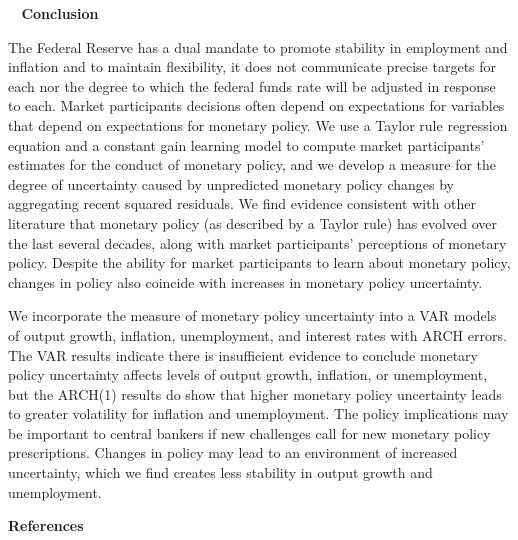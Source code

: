 \documentclass[12pt]{article}
\renewcommand{\section}[1]{\addtocounter{section}{1} \begin{center}\textbf{\thesection~ #1}\end{center}}
\begin{document}
\section{Conclusion}
The Federal Reserve has a dual mandate to promote stability in employment and inflation and to maintain flexibility, it does not communicate precise targets for each nor the degree to which the federal funds rate will be adjusted in response to each.  Market participants decisions often depend on expectations for variables that depend on expectations for monetary policy.  We use a Taylor rule regression equation and a constant gain learning model to compute market participants' estimates for the conduct of monetary policy, and we develop a measure for the degree of uncertainty caused by unpredicted monetary policy changes by aggregating recent squared residuals.  We find evidence consistent with other literature that monetary policy (as described by a Taylor rule) has evolved over the last several decades, along with market participants' perceptions of monetary policy.  Despite the ability for market participants to learn about monetary policy, changes in policy also coincide with increases in monetary policy uncertainty.  

We incorporate the measure of monetary policy uncertainty into a VAR models of output growth, inflation, unemployment, and interest rates with ARCH errors.  The VAR results indicate there is insufficient evidence to conclude monetary policy uncertainty affects levels of output growth, inflation, or unemployment, but the ARCH(1) results do show that higher monetary policy uncertainty leads to greater volatility for inflation and unemployment.  The policy implications may be important to central bankers if new challenges call for new monetary policy prescriptions.  Changes in policy may lead to an environment of increased uncertainty, which we find creates less stability in output growth and unemployment.

\newpage
\renewcommand{\section}[2]{}\begin{center}\textbf{References}\end{center}
\nocite{*}


\newpage
\end{document}
